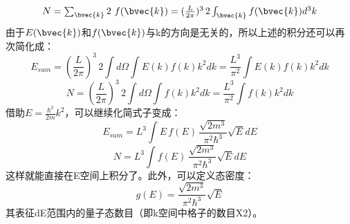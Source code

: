 \begin{equation}
N=\textstyle \sum_{\bvec{k}}2\ f(\bvec{k})=(\frac{L}{2\pi})^3\,2 \int_{\bvec{k}}f(\bvec{k})d^3k
\end{equation}
由于$E(\bvec{k})$和$f(\bvec{k})$与k的方向是无关的，所以上述的积分还可以再次简化成：
\begin{equation}
E_{sum}=(\frac{L}{2\pi})^3\,2\int d\Omega \int E(k)f(k)k^2dk=\frac{L^3}{\pi^2} \int E(k)f(k)k^2dk
\end{equation}
\begin{equation}
N=(\frac{L}{2\pi})^3\,2\int d\Omega \int f(k)k^2dk=\frac{L^3}{\pi^2}\int f(k)k^2dk
\end{equation}
借助$E=\frac{\hbar^2}{2m}k^2$，可以继续化简式子变成：
\begin{equation}
E_{sum}=L^3 \int E\,f(E)\,\frac{\sqrt{2m^3}}{\pi^2\hbar^3}\sqrt{E}dE
\end{equation}
\begin{equation}
N=L^3 \int f(E)\,\frac{\sqrt{2m^3}}{\pi^2\hbar^3}\sqrt{E}dE
\end{equation}
这样就能直接在E空间上积分了。此外，可以定义态密度：
\begin{equation}
g(E)=\frac{\sqrt{2m^3}}{\pi^2\hbar^3}\sqrt{E}
\end{equation}
其表征dE范围内的量子态数目（即k空间中格子的数目X2）。

